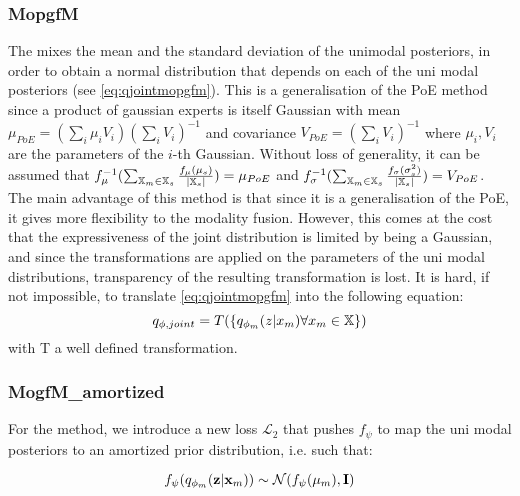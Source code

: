 \subsubsection{MopgfM}\label{subsec:mopgfm}
The  mixes the mean and the standard deviation of the unimodal posteriors, in order to obtain a normal distribution that depends on each of the uni modal posteriors (see \cref{eq:qjointmopgfm}).
This is a generalisation of the PoE method since a product of gaussian experts is itself Gaussian with mean $\mu_{PoE} = (\sum _i \mu _i V_i)(\sum _i V_i)^{-1}$ and covariance $V_{PoE}= (\sum _i V_i)^{-1}$ where $\mu _i, V_i$ are the parameters of the $i$-th Gaussian.
Without loss of generality, it can be assumed that $f_{\mu}^{-1}(\sum _{\mathbb{X}_m \in \mathbb{X}_s} \frac{f_{\mu}(\mu_s)}{|\mathbb{X}_s|}) = \mu_{PoE}$ and $f_{\sigma}^{-1}(\sum  _{\mathbb{X}_m \in \mathbb{X}_s} \frac{f_{\sigma}(\sigma_s^2)}{|\mathbb{X}_s|}) = V_{PoE}$.
The main advantage of this method is that since it is a generalisation of the PoE, it gives more flexibility to the modality fusion.
However, this comes at the cost that the expressiveness of the joint distribution is limited by being a Gaussian, and since the transformations are applied on the parameters of the uni modal distributions, transparency of the resulting transformation is lost.
It is hard, if not impossible, to translate \cref{eq:qjointmopgfm} into the following equation:
\begin{equation}
    q_{\phi, joint} = T(\{q_{\phi _m}(z|x_m) \forall x_m \in \mathbb{X}\})
\end{equation}
with T a well defined transformation.

\begin{figure}[h!]
    \centering
\end{figure}

\subsubsection{MogfM\_amortized}\label{subsubsec:mogfm_amortized}
For the  method, we introduce a new loss $\mathcal{L}_2$ that pushes $f_{\psi}$ to map the uni modal posteriors to an amortized prior distribution, i.e. such that:

\begin{equation}
    \label{eq:amortizedprior}
    f_{\psi}(q_{\phi_m}(\textbf{z}|\textbf{x}_m)) \sim \mathcal{N}(f_{\psi}(\mu_m), \textbf{I})
\end{equation}

